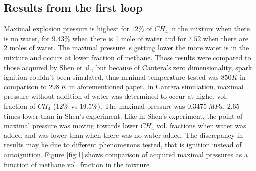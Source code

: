 \documentclass[a4paper]{article}
\begin{document}
\subsection{Results from the first loop}
Maximal explosion pressure is highest for $12\%$ of $CH_4$ in the mixture when there is no water, for $9.43\%$ when there is 1 mole of water and for $7.52$ when there are 2 moles of water. The maximal pressure is getting lower the more water is in the mixture and occurs at lower fraction of methane.
Those results were compared to those acquired by Shen et al.\cite{shen2016explosion}, but because of Cantera's zero dimensionality, spark ignition couldn't been simulated, thus minimal temperature tested was $850 K$ in comparison to $298\ K$ in aforementioned paper.
In Cantera simulation, maximal pressure without addition of water was determined to occur at higher vol. fraction of $CH_4$ (12\% vs 10.5\%). The maximal pressure was $0.3475\ MPa$, 2.65 times lower than in Shen's experiment. Like in Shen's experiment, the point of maximal pressure was moving towards lower $CH_4$ vol. fractions when water was added and was lower than when there was no water added.
The discrepancy in results may be due to different phenomenons tested, that is ignition instead of autoignition.
Figure \ref{fig:1} shows comparison of acquired maximal pressures as a function of methane vol. fraction in the mixture.
\end{document}
